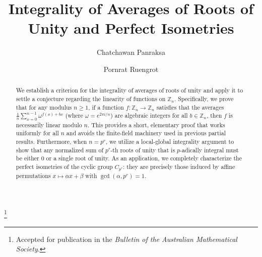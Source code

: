 \documentclass[11pt]{amsart}
\theoremstyle{definition}
\theoremstyle{remark}
\numberwithin{equation}{section}
\begin{document}
\title{Integrality of Averages of Roots of Unity and Perfect Isometries}
\thanks{Accepted for publication in the \emph{Bulletin of the Australian Mathematical Society}.}

\author{Chatchawan Panraksa}
\address{Science Division, Mahidol University International College\newline
Nakhon Pathom, Thailand}

\author{Pornrat Ruengrot}
\address{Science Division, Mahidol University International College\newline
Nakhon Pathom, Thailand}

\date{}

\begin{abstract}

We establish a criterion for the integrality of averages of roots of unity and apply it to settle a conjecture regarding the linearity of functions on $\mathbb{Z}_n$. Specifically, we prove that for any modulus $n \ge 1$, if a function $f: \mathbb{Z}_n \to \mathbb{Z}_n$ satisfies that the averages $\frac{1}{n} \sum_{x=0}^{n-1} \omega^{f(x)+bx}$ (where $\omega=e^{2\pi i/n}$) are algebraic integers for all $b \in \mathbb{Z}_n$, then $f$ is necessarily linear modulo $n$. This provides a short, elementary proof that works uniformly for all $n$ and avoids the finite-field machinery used in previous partial results. Furthermore, when $n=p^r$, we utilize a local-global integrality argument to show that any normalized sum of $p^r$-th roots of unity that is $p$-adically integral must be either $0$ or a single root of unity. As an application, we completely characterize the perfect isometries of the cyclic group $C_{p^r}$: they are precisely those induced by affine permutations $x \mapsto \alpha x + \beta$ with $\gcd(\alpha, p^r)=1$.

\end{abstract}


\maketitle
\end{document}
